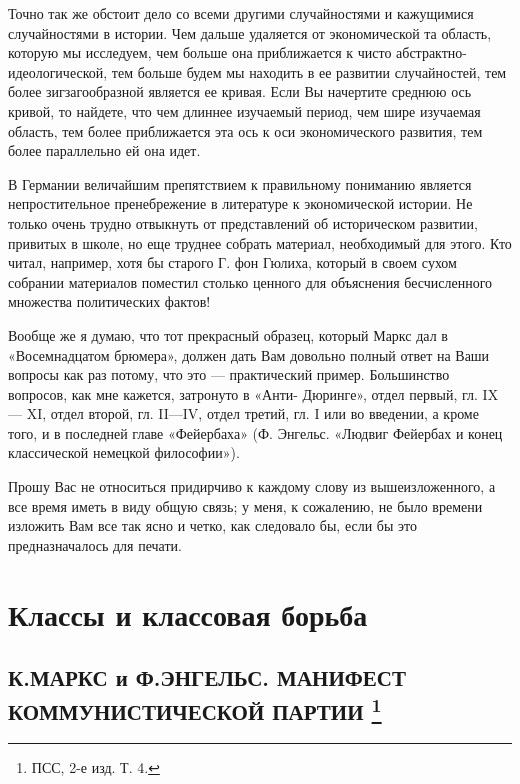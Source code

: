 \documentclass[12pt]{article}
\newcommand\resetparcount{%
  \setcounter{parcount}{0}
}
\newcommand{\parnum}{(\arabic{parcount})}
\newcounter{parcount}
\newenvironment{parnumbers}{%
  \par%
  \everypar{\noindent \stepcounter{parcount}\marginpar[]{\parnum}}%
}{}
\begin{document}
\begin{parnumbers}
    Точно так же обстоит дело со всеми другими случайностями и кажущимися случайностями в истории. Чем дальше удаляется от экономической та область, которую мы исследуем, чем больше она приближается к чисто абстрактно-идеологической, тем больше будем мы находить в ее развитии случайностей, тем более зигзагообразной является ее кривая. Если Вы начертите среднюю ось кривой, то найдете, что чем длиннее изучаемый период, чем шире изучаемая область, тем более приближается эта ось к оси экономического развития, тем более параллельно ей она идет.

    В Германии величайшим препятствием к правильному пониманию является непростительное пренебрежение в литературе к экономической истории. Не только очень трудно отвыкнуть от представлений об историческом развитии, привитых в школе, но еще труднее собрать материал, необходимый для этого. Кто читал, например, хотя бы старого Г. фон Гюлиха, который в своем сухом собрании материалов поместил столько ценного для объяснения бесчисленного множества политических фактов!

    Вообще же я думаю, что тот прекрасный образец, который Маркс дал в «Восемнадцатом брюмера», должен дать Вам довольно полный ответ на Ваши вопросы как раз потому, что это — практический пример. Большинство вопросов, как мне кажется, затронуто в «Анти- Дюринге», отдел первый, гл. IX— XI, отдел второй, гл. II—IV, отдел третий, гл. I или во введении, а кроме того, и в последней главе «Фейербаха» (Ф. Энгельс. «Людвиг Фейербах и конец классической немецкой философии»).

    Прошу Вас не относиться придирчиво к каждому слову из вышеизложенного, а все время иметь в виду общую связь; у меня, к сожалению, не было времени изложить Вам все так ясно и четко, как следовало бы, если бы это предназначалось для печати.
\end{parnumbers}




\section{Классы и классовая борьба}
\resetparcount
\subsection{К.МАРКС и Ф.ЭНГЕЛЬС.  МАНИФЕСТ КОММУНИСТИЧЕСКОЙ ПАРТИИ \footnote{ПСС, 2-е изд. Т. 4.}}
\end{document}
